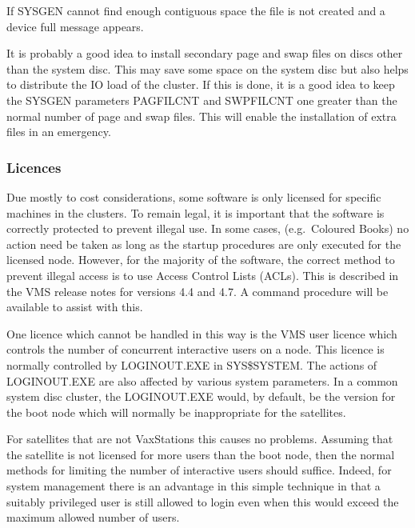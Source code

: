 If SYSGEN cannot find enough contiguous space the file is not created and
a device full message appears.

It is probably a good idea to install secondary page and swap files on
discs other than the system disc.
This may save some space on the system disc but also helps to distribute the
IO load of the cluster.
If this is done, it is a good idea to keep the SYSGEN parameters PAGFILCNT
and SWPFILCNT one greater than the normal number of page and swap files.
This will enable the installation of extra files in an emergency.

\subsubsection {Licences}

Due mostly to cost considerations, some software is only licensed for
specific machines in the clusters.
To remain legal, it is important that the software is correctly protected
to prevent illegal use.
In some cases, (e.g.\ Coloured Books) no action need be taken as long as
the startup procedures are only executed for the licensed node.
However, for the majority of the software, the correct method to prevent
illegal access is to use Access Control Lists (ACLs).
This is described in the VMS release notes for versions 4.4 and 4.7.
A command procedure will be available to assist with this.

One licence which cannot be handled in this way is the VMS user licence which
controls the number of concurrent interactive users on a node.
This licence is normally controlled by LOGINOUT.EXE in SYS\$SYSTEM.
The actions of LOGINOUT.EXE are also affected by various system parameters.
In a common system disc cluster, the LOGINOUT.EXE would, by default, be the
version for the boot node which will normally be inappropriate for the
satellites.

For satellites that are not VaxStations this causes no problems.
Assuming that the satellite is not licensed for more users than the boot node,
then the normal methods for limiting the number of interactive users should
suffice.
Indeed, for system management there is an advantage in this simple technique
in that a suitably privileged user is still allowed to login even when this
would exceed the maximum allowed number of users.


